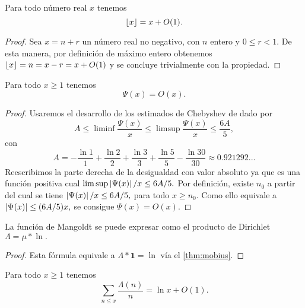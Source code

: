 \begin{lemma}
  \label{lem:floor-is-x-o1}
  Para todo n\'umero real \(x\) tenemos
  \[
    \left\lfloor x \right\rfloor = x + O(1).
  \]
\end{lemma}

\begin{proof}
  Sea \(x = n + r\) un n\'umero real no negativo, con
  \(n\) entero y \(0 \leq r < 1\).
  De esta manera, por definici\'on de m\'aximo entero obtenemos
  \(
    \left\lfloor x \right\rfloor = n = x - r = x + O(1)
  \)
  y se concluye trivialmente con la propiedad.
\end{proof}

\begin{lemma}
  \label{lem:psi-is-ox}
  Para todo \(x \geq 1\) tenemos
  \[
    \Psi(x) = O(x).
  \]
\end{lemma}

\begin{proof}
  Usaremos el desarrollo de los estimados de Chebyshev de \cite[secci\'on 3]{Diamond1982} dado por
  \[
    A \leq \liminf \frac{\Psi(x)}{x} \leq \limsup \frac{\Psi(x)}{x} \leq \frac{6A}{5},
  \]
  con
  \[
    A = -\frac{\ln 1}{1} + \frac{\ln 2}{2} + \frac{\ln 3}{3} + \frac{\ln 5}{5} - \frac{\ln 30}{30}
    \approx 0.921292...
  \]
  Reescribimos la parte derecha de la desigualdad con valor absoluto ya que es una funci\'on positiva cual
  \(
    \limsup \left\lvert \Psi(x) \right\rvert/x \leq 6A/5.
  \)
  Por definici\'on, existe \(n_0\) a partir del cual se tiene
  \(
    \left\lvert \Psi(x) \right\rvert/x \leq 6A/5,
  \)
  para todo \(x \geq n_0\).
  Como ello equivale a
  \(
    \left\lvert \Psi(x) \right\rvert \leq (6A/5) x,
  \)
  se consigue \(\Psi(x) = O(x)\).
\end{proof}

\begin{lemma}
  \label{lem:mangoldt-is-mu-ln}
  La funci\'on de Mangoldt se puede expresar como el producto de Dirichlet
  \(
    \Lambda = \mu * \ln.
  \)
\end{lemma}

\begin{proof}
  Esta f\'ormula equivale a
  \(\Lambda * \textbf{1} = \ln\)
  v\'ia el \cref{thm:mobius}.
\end{proof}

\begin{lemma}
  \label{lem:mangoldt-n-lnx-o1}
  Para todo \(x \geq 1\) tenemos
  \[
    \sum_{n \leq x} \frac{\Lambda(n)}{n} = \ln x + O(1).
  \]
\end{lemma}

